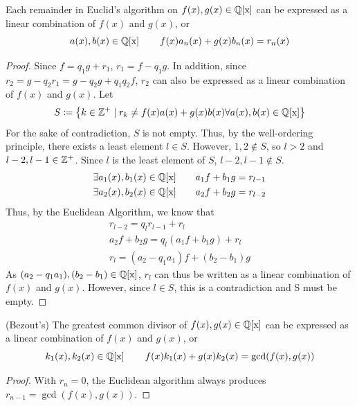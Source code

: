 \begin{theorem}Each remainder in Euclid's algorithm on $f(x), g(x) \in \operatorname{\mathbb{Q}[x]}$ can be expressed as a linear combination of $f(x)$ and $g(x)$, or \[a(x), b(x) \in \operatorname{\mathbb{Q}[x]} \qquad f(x)a_n(x)+g(x)b_n(x) = r_n(x)\] \end{theorem}
\begin{proof}
    Since $f = q_1g+r_1$, $r_1=f-q_1g$. In addition, since $r_2=g-q_2r_1=g-q_2g+q_1q_2f$, $r_2$ can also be expressed as a linear combination of $f(x)$ and $g(x)$. Let 
    \[S \coloneq \left \{ k \in \mathbb{Z}^+ \mid r_k \neq f(x)a(x)+g(x)b(x) \forall  a(x), b(x) \in \operatorname{\mathbb{Q}[x]} \right\}\]
    For the sake of contradiction, $S$ is not empty. Thus, by the well-ordering principle, there exists a least element $l \in S$. However, $1, 2 \notin S$, so $l>2$ and $l-2, l-1 \in \mathbb{Z}^+$. Since $l$ is the least element of $S$, $l-2, l-1\notin S$. 
    \begin{align*} \exists a_1(x), b_1(x) \in \operatorname{\mathbb{Q}[x]} &\qquad a_1f+b_1g = r_{l-1} \\
        \exists a_2(x), b_2(x) \in \operatorname{\mathbb{Q}[x]} &\qquad a_2f+b_2g = r_{l-2}
    \end{align*}
    Thus, by the Euclidean Algorithm, we know that 
    \begin{align*}
        r_{l-2} = q_l r_{l-1}+r_l \\
        a_2f+b_2g = q_l(a_1f+b_1g)+r_l \\
        r_l = (a_2-q_1a_1)f + (b_2-b_1)g
    \end{align*}
    As $(a_2-q_1a_1), (b_2-b_1) \in \operatorname{\mathbb{Q}[x]}$, $r_l$ can thus be written as a linear combination of $f(x)$ and $g(x)$. However, since $l \in S$, this is a contradiction and S must be empty. 

    
\end{proof}
\begin{corollary} (Bezout's) The greatest common divisor of $f(x), g(x) \in \operatorname{\mathbb{Q}[x]}$ can be expressed as a linear combination of $f(x)$ and $g(x)$, or \[k_1(x), k_2(x) \in \operatorname{\mathbb{Q}[x]} \qquad f(x)k_1(x)+g(x)k_2(x) = \operatorname{gcd}(f(x), g(x)) \]
\end{corollary}
\begin{proof}
    With $r_n=0$, the Euclidean algorithm always produces $r_{n-1} = \gcd(f(x), g(x))$.
\end{proof}

